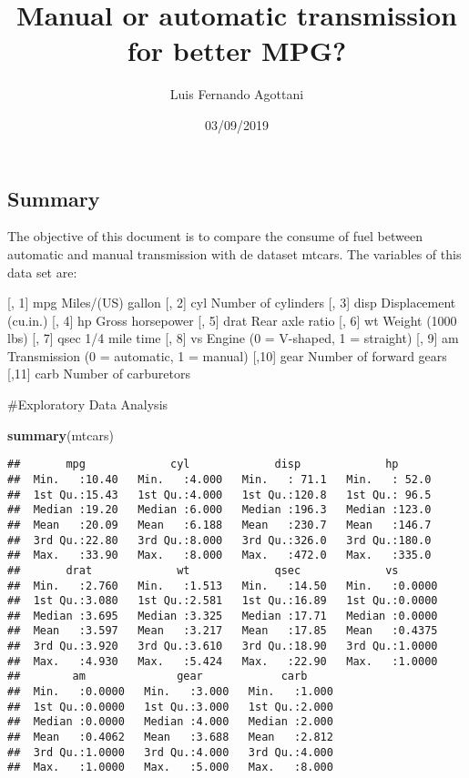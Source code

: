 \documentclass[]{article}
\title{Manual or automatic transmission for better MPG?}
\author{Luis Fernando Agottani}
\date{03/09/2019}
\newenvironment{Shaded}{\begin{snugshade}}{\end{snugshade}}
\newcommand{\KeywordTok}[1]{\textcolor[rgb]{0.13,0.29,0.53}{\textbf{#1}}}
\newcommand{\NormalTok}[1]{#1}
\begin{document}
\maketitle

\hypertarget{summary}{%
\subsection{Summary}\label{summary}}

The objective of this document is to compare the consume of fuel between
automatic and manual transmission with de dataset mtcars. The variables
of this data set are:

{[}, 1{]} mpg Miles/(US) gallon {[}, 2{]} cyl Number of cylinders {[},
3{]} disp Displacement (cu.in.) {[}, 4{]} hp Gross horsepower {[}, 5{]}
drat Rear axle ratio {[}, 6{]} wt Weight (1000 lbs) {[}, 7{]} qsec 1/4
mile time {[}, 8{]} vs Engine (0 = V-shaped, 1 = straight) {[}, 9{]} am
Transmission (0 = automatic, 1 = manual) {[},10{]} gear Number of
forward gears {[},11{]} carb Number of carburetors

\#Exploratory Data Analysis

\begin{Shaded}
\begin{Highlighting}[]
\KeywordTok{summary}\NormalTok{(mtcars)}
\end{Highlighting}
\end{Shaded}

\begin{verbatim}
##       mpg             cyl             disp             hp       
##  Min.   :10.40   Min.   :4.000   Min.   : 71.1   Min.   : 52.0  
##  1st Qu.:15.43   1st Qu.:4.000   1st Qu.:120.8   1st Qu.: 96.5  
##  Median :19.20   Median :6.000   Median :196.3   Median :123.0  
##  Mean   :20.09   Mean   :6.188   Mean   :230.7   Mean   :146.7  
##  3rd Qu.:22.80   3rd Qu.:8.000   3rd Qu.:326.0   3rd Qu.:180.0  
##  Max.   :33.90   Max.   :8.000   Max.   :472.0   Max.   :335.0  
##       drat             wt             qsec             vs        
##  Min.   :2.760   Min.   :1.513   Min.   :14.50   Min.   :0.0000  
##  1st Qu.:3.080   1st Qu.:2.581   1st Qu.:16.89   1st Qu.:0.0000  
##  Median :3.695   Median :3.325   Median :17.71   Median :0.0000  
##  Mean   :3.597   Mean   :3.217   Mean   :17.85   Mean   :0.4375  
##  3rd Qu.:3.920   3rd Qu.:3.610   3rd Qu.:18.90   3rd Qu.:1.0000  
##  Max.   :4.930   Max.   :5.424   Max.   :22.90   Max.   :1.0000  
##        am              gear            carb      
##  Min.   :0.0000   Min.   :3.000   Min.   :1.000  
##  1st Qu.:0.0000   1st Qu.:3.000   1st Qu.:2.000  
##  Median :0.0000   Median :4.000   Median :2.000  
##  Mean   :0.4062   Mean   :3.688   Mean   :2.812  
##  3rd Qu.:1.0000   3rd Qu.:4.000   3rd Qu.:4.000  
##  Max.   :1.0000   Max.   :5.000   Max.   :8.000
\end{verbatim}
\end{document}
